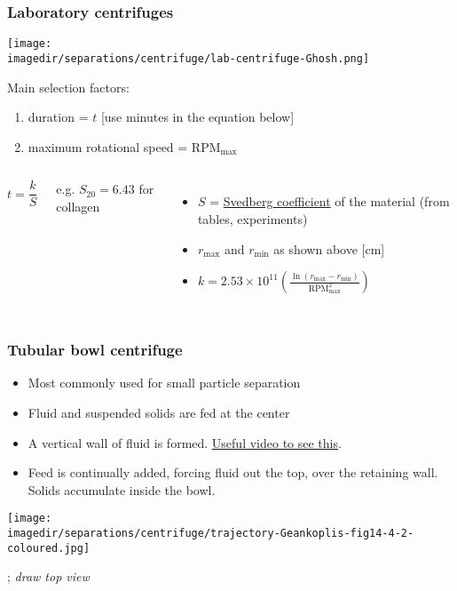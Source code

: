\begin{frame}\frametitle{Laboratory centrifuges}

	\begin{center}
		\texttt{[image: \\imagedir/separations/centrifuge/lab-centrifuge-Ghosh.png]}
	\end{center}
	\vspace{-12pt}
	Main selection factors:
	\begin{enumerate}
		\item	duration = $t$ [use minutes in the equation below]
		\item	maximum rotational speed = $\text{RPM}_\text{max}$ 	%
	\end{enumerate}
	\vspace{-12pt}
	\begin{columns}[t]
			\[
				t = \displaystyle \frac{k}{S}
			\]

			\vspace{24pt}
			{\small e.g. $S_{20} = 6.43$ for collagen}
			\begin{itemize}
				\item	$S$ = \href{http://en.wikipedia.org/wiki/Svedberg}{Svedberg coefficient} of the material (from tables, experiments)
				\item	$r_\text{max}$ and $r_\text{min}$ as shown above [cm]
				\item	$k = 2.53 \times 10^{11} \left(\displaystyle \frac{\ln\left( r_\text{max} -r_\text{min} \right)}{\text{RPM}_\text{max}^2} \right)$
			\end{itemize}
	\end{columns}
\end{frame}

\begin{frame}\frametitle{Tubular bowl centrifuge}
	\begin{itemize}
		\item	Most commonly used for small particle separation
		\item	Fluid and suspended solids are fed at the center
		\item	A vertical wall of fluid is formed. \href{http://www.youtube.com/watch?v=cUhgKFV5Ri4}{Useful video to see this}.
		\item	Feed is continually added, forcing fluid out the top, over the retaining wall. Solids accumulate inside the bowl.
	\end{itemize}
	\begin{center}
		\texttt{[image: \\imagedir/separations/centrifuge/trajectory-Geankoplis-fig14-4-2-coloured.jpg]}
	\end{center}
	\vspace{-24pt}	
	; {\tiny \emph{draw top view}}
\end{frame}

